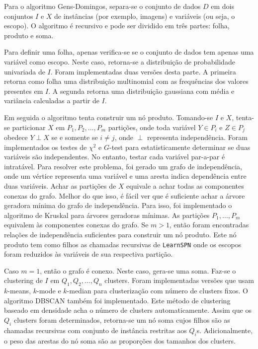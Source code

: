 \documentclass[12pt]{article}
\theoremstyle{plain}
\numberwithin{equation}{section}
\newcommand{\indep}{\perp}
\newcommand{\code}[1]{\lstinline[mathescape=true]{#1}}
\begin{document}
Para o algoritmo Gens-Domingos, separa-se o conjunto de dados $D$ em dois conjuntos $I$ e $X$ de
instâncias (por exemplo, imagens) e variáveis (ou seja, o escopo). O algoritmo é recursivo e pode
ser dividido em três partes: folha, produto e soma.

Para definir uma folha, apenas verifica-se se o conjunto de dados tem apenas uma variável como
escopo. Neste caso, retorna-se a distribuição de probabilidade univariada de $I$. Foram
implementadas duas versões desta parte. A primeira retorna como folha uma distribuição multinomial
com as frequências dos valores presentes em $I$. A segunda retorna uma distribuição gaussiana com
média e variância calculadas a partir de $I$.

Em seguida o algoritmo tenta construir um nó produto. Tomando-se $I$ e $X$, tenta-se particionar
$X$ em $P_1,P_2,\ldots,P_m$ partições, onde toda variável $Y\in P_i$ e $Z\in P_j$ obedece $Y\indep
X$ se e somente se $i\neq j$, onde $\indep$ representa independência. Foram implementados os testes
de $\chi^2$ e $G$-test para estatisticamente determinar se duas variáveis são independentes. No
entanto, testar cada variável par-a-par é intratável. Para resolver este problema, foi gerado um
grafo de independência, onde um vértice representa uma variável e uma aresta indica dependência
entre duas variáveis. Achar as partições de $X$ equivale a achar todas as componentes conexas do
grafo. Melhor do que isso, é fácil ver que é suficiente achar a árvore geradora mínima do grafo de
independência. Para isso, foi implementado o algoritmo de Kruskal para árvores geradoras mínimas.
As partições $P_1,\ldots,P_m$ equivalem às componentes conexas do grafo. Se $m>1$, então foram
encontradas relações de independência suficientes para construir um nó produto. Este nó produto tem
como filhos as chamadas recursivas de \code{LearnSPN} onde os escopos foram reduzidos às variáveis
de sua respectiva partição.

Caso $m=1$, então o grafo é conexo. Neste caso, gera-se uma soma. Faz-se o clustering de $I$ em
$Q_1,Q_2,\ldots,Q_n$ clusters. Foram implementadas versões que usam $k$-means, $k$-mode e
$k$-median para clusterização com número de clusters fixos. O algoritmo DBSCAN também foi
implementado. Este método de clustering baseado em densidade acha o número de clusters
automaticamente. Assim que os $Q_i$ clusters foram determinados, retorna-se um nó soma cujos filhos
são as chamadas recursivas com conjunto de instância restritas aos $Q_i$s. Adicionalmente, o peso
das arestas do nó soma são as proporções dos tamanhos dos clusters.
\end{document}
